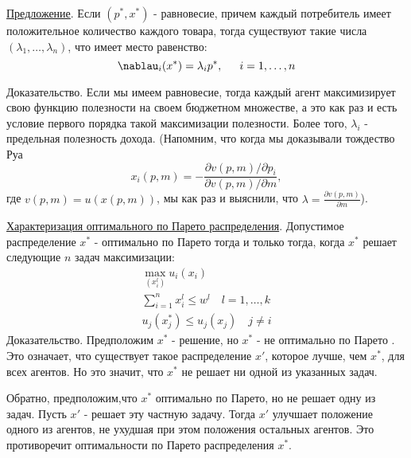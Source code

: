 \underline{Предложение}. Если $(p^*,x^*)$ - равновесие, причем каждый потребитель имеет
положительное количество каждого товара, тогда существуют такие числа
$(\lambda_1,\ldots,\lambda_n)$, что имеет место равенство:
$$
\nablau_i(x^*)=\lambda_ip^*,\,\,\,\quad i=1,\ldots,n
$$

Доказательство. Если мы имеем равновесие, тогда каждый агент
максимизирует свою функцию полезности на своем бюджетном  множестве,
а это как раз и есть условие
первого порядка такой максимизации полезности. Более того,
$\lambda_i$ - предельная полезность дохода. (Напомним, что когда мы доказывали
тождество Руа
$$
x_i(p,m)=-{\frac{\partial v(p,m)/\partial p_i}{\partial v(p,m)/\partial m}},
$$
где $v(p,m)=u(x(p,m))$, мы как раз и выяснили, что $\lambda={\frac{\partial v(p,m)}{\partial m}}$).

\underline{Характеризация оптимального по Парето  распределения}.
Допустимое распределение $x^*$ - оптимально по Парето  тогда и
только тогда, когда $x^*$ решает следующие $n$ задач максимизации:
$$
\begin{array}{c}
\max_{(x^l_i)}u_i(x_i)\\
\sum^n_{i=1}x^l_i\le w^l\quad l=1,\ldots,k\\
u_j(x^*_j)\le u_j(x_j)\quad j\ne i
\end{array}
$$
Доказательство. Предположим $x^*$ - решение, но $x^*$ -  не
оптимально по Парето . Это означает, что существует такое распределение $x'$,
которое лучше, чем $x^*$, для всех агентов. Но это значит, что
$x^*$ не решает ни одной из указанных задач.

Обратно, предположим,что $x^*$ оптимально по Парето, но
не решает одну из задач. Пусть $x'$ - решает эту частную задачу.
Тогда $x'$ улучшает положение одного из агентов, не ухудшая при этом
положения остальных агентов. Это противоречит оптимальности по Парето распределения $x^*$.

